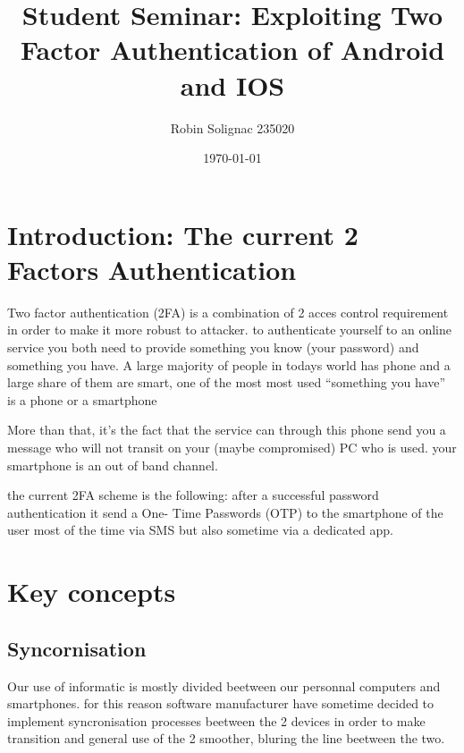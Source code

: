 \documentclass[11pt, a4paper,twocolumn]{article}
\title{Student Seminar: Exploiting Two Factor Authentication of Android and IOS}
\author{Robin Solignac 235020}
\date{\today}
\begin{document}
\maketitle
\begin{comment}
\begin{abstract}
Applications  which  can  be  used  in  different  platforms  now  use  two
factor authentication (2FA) to allow users to conveniently switch from one platform to another.
For example, when a user tries to login his gmail, it is not enough to enter correct password 
(first factor), it is also necessary to enter a PIN which is received by an SMS (second factor).
The aim of this project explaining the attacks against 2FA in IOS and Android devices and 
what can be the solutions. 
\end{abstract}
\end{comment}

\section{Introduction: The current 2 Factors Authentication}

Two factor authentication (2FA) is a combination of 2 acces control requirement in 
order to make it more robust to attacker. to authenticate yourself to an online 
service you both need to provide something you know (your password) and 
something you have. 
A large majority of people in todays world has phone and a large share of 
them are smart, one of the most most used ``something you have''  is a phone or 
a smartphone

More than that, it's the fact that the service can through this phone
send you a message  who will not transit on your (maybe compromised) PC 
who is used. your smartphone is an out of band channel.

the current 2FA scheme is the following: after a successful password authentication it send a One-
Time Passwords (OTP) to the smartphone of the user most of the time via SMS 
but also sometime via a dedicated app.

\section{Key concepts}
\subsection{Syncornisation}
Our use of informatic is mostly divided beetween our personnal computers 
and smartphones. for this reason software manufacturer have sometime decided to implement 
syncronisation processes beetween the 2 devices in order to make transition and 
general use of the 2 smoother, bluring the line beetween the two. 
\end{document}
